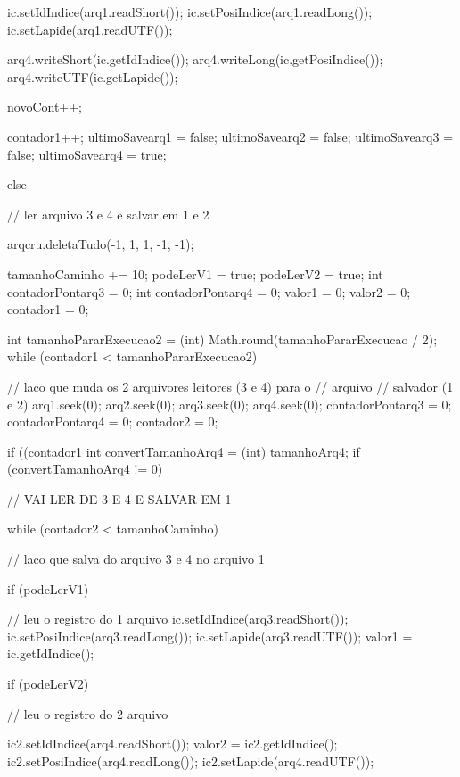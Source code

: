 {{{{{{                  ic.setIdIndice(arq1.readShort());
                  ic.setPosiIndice(arq1.readLong());
                  ic.setLapide(arq1.readUTF());

                  arq4.writeShort(ic.getIdIndice());
                  arq4.writeLong(ic.getPosiIndice());
                  arq4.writeUTF(ic.getLapide());

                  novoCont++;
                }
                contador1++;
                ultimoSavearq1 = false;
                ultimoSavearq2 = false;
                ultimoSavearq3 = false;
                ultimoSavearq4 = true;
              }
            }
          }

        } else {// ler arquivo 3 e 4 e salvar em 1 e 2

          arqcru.deletaTudo(-1, 1, 1, -1, -1);

          tamanhoCaminho += 10;
          podeLerV1 = true;
          podeLerV2 = true;
          int contadorPontarq3 = 0;
          int contadorPontarq4 = 0;
          valor1 = 0;
          valor2 = 0;
          contador1 = 0;

          int tamanhoPararExecucao2 = (int) Math.round(tamanhoPararExecucao / 2);
          while (contador1 < tamanhoPararExecucao2) {// laco que muda os 2 arquivores leitores (3 e 4) para o
                                                     // arquivo
            // salvador (1 e 2)
            arq1.seek(0);
            arq2.seek(0);
            arq3.seek(0);
            arq4.seek(0);
            contadorPontarq3 = 0;
            contadorPontarq4 = 0;
            contador2 = 0;

            if ((contador1 %
              int convertTamanhoArq4 = (int) tamanhoArq4;
              if (convertTamanhoArq4 != 0) {// VAI LER DE 3 E 4 E SALVAR EM 1

                while (contador2 < tamanhoCaminho) {// laco que salva do arquivo 3 e 4 no arquivo 1

                  if (podeLerV1) {
                    // leu o registro do 1 arquivo
                    ic.setIdIndice(arq3.readShort());
                    ic.setPosiIndice(arq3.readLong());
                    ic.setLapide(arq3.readUTF());
                    valor1 = ic.getIdIndice();

                  }

                  if (podeLerV2) {
                    // leu o registro do 2 arquivo

                    ic2.setIdIndice(arq4.readShort());
                    valor2 = ic2.getIdIndice();
                    ic2.setPosiIndice(arq4.readLong());
                    ic2.setLapide(arq4.readUTF());

}}}}}}
